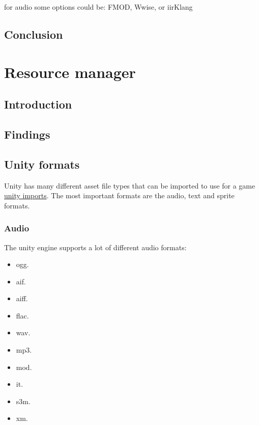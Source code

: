\documentclass{projdoc}
\begin{document}
for audio some options could be: FMOD, Wwise, or iirKlang

\subsection{Conclusion}

\section{Resource manager}

\subsection{Introduction}

\subsection{Findings}

\subsection{Unity formats}

Unity has many different asset file types that can be imported to use for a game
\href{https://docs.unity3d.com/Manual/BuiltInImporters.html}{unity imports}. The most
important formats are the audio, text and sprite formats.

\subsubsection{Audio}

The unity engine supports a lot of different audio formats:\noparbreak
\begin{multicols}{5}
\begin{itemize}
	\item ogg.
	\item aif.
	\item aiff.
	\item flac.
	\item wav.
	\item mp3.
	\item mod.
	\item it.
	\item s3m.
	\item xm.
\end{itemize}
\end{multicols}
\end{document}

